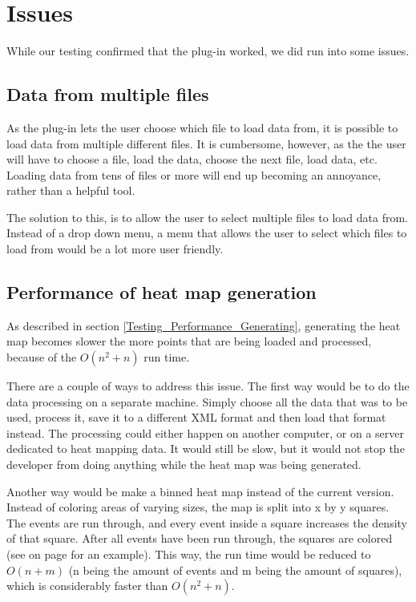 \section{Issues}
\label{Issues}

While our testing confirmed that the plug-in worked, we did run into some issues.

\subsection{Data from multiple files}
\label{Issues_MoreFiles}

As the plug-in lets the user choose which file to load data from, it is possible to load data from multiple different files. It is cumbersome, however, as the the user will have to choose a file, load the data, choose the next file, load data, etc. Loading data from tens of files or more will end up becoming an annoyance, rather than a helpful tool.

The solution to this, is to allow the user to select multiple files to load data from. Instead of a drop down menu, a menu that allows the user to select which files to load from would be a lot more user friendly.

\subsection{Performance of heat map generation}
\label{Issues_GenerationPerformance}

As described in section \ref{Testing_Performance_Generating}, generating the heat map becomes slower the more points that are being loaded and processed, because of the $O(n^2 + n)$ run time.

There are a couple of ways to address this issue. The first way would be to do the data processing on a separate machine. Simply choose all the data that was to be used, process it, save it to a different XML format and then load that format instead. The processing could either happen on another computer, or on a server dedicated to heat mapping data. It would still be slow, but it would not stop the developer from doing anything while the heat map was being generated.

Another way would be make a binned heat map instead of the current version. Instead of coloring areas of varying sizes, the map is split into x by y squares. The events are run through, and every event inside a square increases the density of that square. After all events have been run through, the squares are colored (see  on page \pageref{fig:HM_B} for an example). This way, the run time would be reduced to $O(n + m)$ (n being the amount of events and m being the amount of squares), which is considerably faster than $O(n^2 + n)$.

